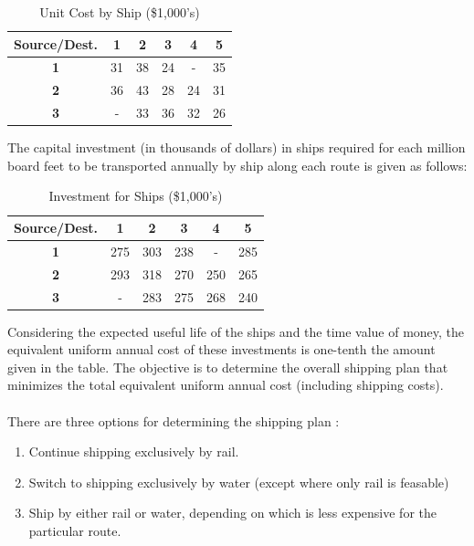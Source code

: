 \documentclass[12pt]{article}
\numberwithin{equation}{section}
\numberwithin{table}{section}
\numberwithin{figure}{section}
\begin{document}
\begin{table}[h!]
\centering
\caption{Unit Cost by Ship (\$1,000's)}
\label{shipcost}
\begin{tabular}{|c|c|c|c|c|c|}
\hline
\textbf{Source/Dest.} & \textbf{1} & \textbf{2} & \textbf{3} & \textbf{4} & \textbf{5} \\ \hline
\textbf{1}            & 31         & 38         & 24         & -         & 35         \\ \hline
\textbf{2}            & 36         & 43         & 28         & 24         & 31         \\ \hline
\textbf{3}            & -         & 33         & 36         & 32         & 26         \\ \hline
\end{tabular}
\end{table}

The capital investment (in thousands of dollars) in ships required for each million board feet to be transported annually by ship along each route is given as follows:

\begin{table}[h!]
\centering
\caption{Investment for Ships (\$1,000's)}
\label{shipinvest}
\begin{tabular}{|c|c|c|c|c|c|}
\hline
\textbf{Source/Dest.} & \textbf{1} & \textbf{2} & \textbf{3} & \textbf{4} & \textbf{5} \\ \hline
\textbf{1}            & 275         & 303         & 238         & -         & 285         \\ \hline
\textbf{2}            & 293         & 318         & 270         & 250         & 265         \\ \hline
\textbf{3}            & -         & 283         & 275         & 268         & 240        \\ \hline
\end{tabular}
\end{table}

Considering the expected useful life of the ships and the time value of money, the equivalent uniform annual cost of these investments is one-tenth the amount given in the table. The objective is to determine the overall shipping plan that minimizes the total equivalent uniform annual cost (including shipping costs). \\ \\
There are three options for determining the shipping plan :
\begin{enumerate}
	\item Continue shipping exclusively by rail.
	\item Switch to shipping exclusively by water (except where only rail is feasable)
	\item Ship by either rail or water, depending on which is less expensive for the particular route.
\end{enumerate}
\end{document}
